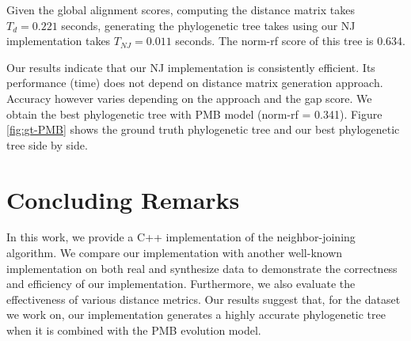 \documentclass[11pt,letterpaper]{article}
\theoremstyle{definition}
\begin{document}
Given the global alignment scores, computing the distance matrix takes $T_d=0.221$ seconds, generating the phylogenetic tree takes using our NJ implementation takes $T_{NJ} = 0.011$ seconds. The norm-rf score of this tree is $0.634$.

Our results indicate that our NJ implementation is consistently efficient. Its performance (time) does not depend on distance matrix generation approach. Accuracy however varies depending on the approach and the gap score. We obtain the best phylogenetic tree with PMB model (norm-rf = 0.341). Figure \ref{fig:gt-PMB} shows the ground truth phylogenetic tree and our best phylogenetic tree side by side. 

\section{Concluding Remarks}

In this work, we provide a C++ implementation of the neighbor-joining algorithm. We compare our implementation with another well-known implementation on both real and synthesize data to demonstrate the correctness and efficiency of our implementation. Furthermore, we also evaluate the effectiveness of various distance metrics. Our results suggest that, for the dataset we work on, our implementation generates a highly accurate phylogenetic tree when it is combined with the PMB evolution model.




\end{document}
